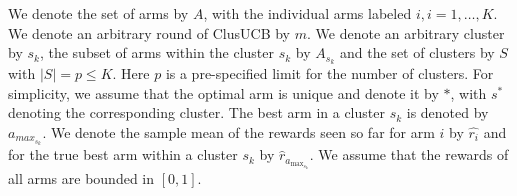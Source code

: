 We denote the set of arms by $A$, with the individual arms labeled $i, i=1,\ldots,K$.
We denote an arbitrary round of ClusUCB by $m$. We denote an arbitrary cluster by $s_{k}$, the subset of arms within the cluster $s_k$ by  $A_{s_{k}}$ and the set of clusters by $S$ with $|S|=p\leq K$. 
Here $p$ is a pre-specified limit for the number of clusters.
For simplicity, we assume that the optimal arm is unique and denote it by ${*}$, with $s^{*}$ denoting the corresponding cluster.
The best arm in a cluster $s_{k}$ is denoted by $a_{max_{s_{k}}}$.  
We denote the sample mean of the rewards seen so far for arm $i$ by $\widehat{r_i}$ and for the true best arm within a cluster $s_k$ by $\widehat{r}_{a_{\max_{s_{k}}}}$. 
We assume that the rewards of all arms are bounded in $[0,1]$.


